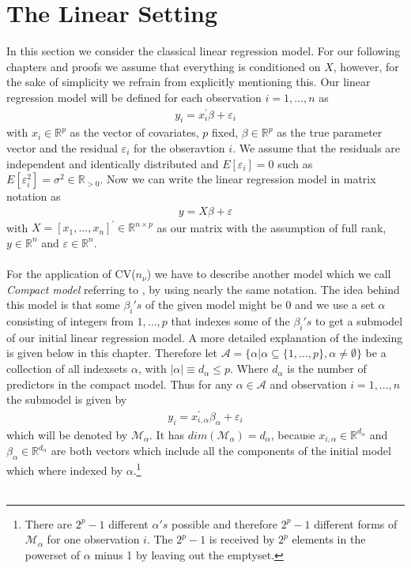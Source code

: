 \documentclass[Research_Module_ES.tex]{subfiles}
\begin{document}
\section{The Linear Setting}
In this section we consider the classical linear regression model. For our following chapters and proofs we assume that everything is conditioned on $X$, however, for the sake of simplicity we refrain from explicitly mentioning this. Our linear regression model will be defined for each observation $i=1,...,n$ as
\begin{align*}
y_i=x_i^\prime\beta+\varepsilon_i
\end{align*}
with $x_i\in\mathbb{R}^p$ as the vector of covariates, $p$ fixed, $\beta\in\mathbb{R}^p$ as the true parameter vector and the residual $\varepsilon_i$ for the obseravtion $i$.
We assume that the residuals are independent and identically distributed and $E[\varepsilon_i]=0$ such as $E[\varepsilon_i^2]=\sigma^2\in\mathbb{R}_{>0}$. Now we can write the linear regression model in matrix notation as
\begin{align*}
	y=X\beta+\varepsilon
\end{align*}
with $X=[x_1,...,x_n]^\prime\in\mathbb{R}^{n\times p}$ as our matrix with the assumption of full rank, $y\in\mathbb{R}^{n}$ and $\varepsilon\in\mathbb{R}^{n}$.
\\\\
For the application of CV($n_\nu$) we have to describe another model which we call \textit{Compact model} referring to \cite{shao}, by using nearly the same notation. The idea behind this model is that some $\beta_i's$ of the given model might be $0$ and we use a set $\alpha$ consisting of integers from $1,...,p$ that indexes some of the $\beta_i's$ to get a submodel of our initial linear regression model. A more detailed explanation of the indexing is given below in this chapter. Therefore let 
$\mathcal{A}=\{\alpha|\alpha\subseteq\{1,...,p\},\alpha\neq\emptyset\}$ be a collection of all indexsets $\alpha$, with 
$|\alpha|\equiv d_\alpha\leq p$. Where $d_\alpha$ is the number of predictors in the compact model. Thus for any $\alpha\in\mathcal{A}$ and observation $i=1,...,n$ the submodel is given by
\begin{align*}
	y_i=x_{i,\alpha}^\prime\beta_\alpha+\varepsilon_i
\end{align*}
which will be denoted by $\mathcal{M}_\alpha$. It has  $dim(\mathcal{M}_\alpha)=d_\alpha$, because $x_{i,\alpha}\in\mathbb{R}^{d_\alpha}$ and $\beta_\alpha\in\mathbb{R}^{d_\alpha}$ are both vectors which include all the components of the initial model which where indexed by $\alpha$.\footnote{There are $2^p-1$ different $\alpha's$ possible and therefore $2^p-1$ different forms of $\mathcal{M}_\alpha$ for one observation $i$. The $2^p-1$ is received by $2^p$ elements in the powerset of $\alpha$ minus 1 by leaving out the emptyset.}\\\\
\end{document}
